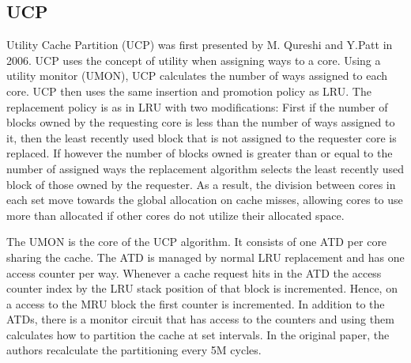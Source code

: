 \subsection{UCP}
\label{sec:background:algorithms:ucp}

Utility Cache Partition (UCP)\cite{Qureshi2006} was first presented by M. Qureshi and Y.Patt in 2006. 
UCP uses the concept of utility when assigning ways to a core.
Using a utility monitor (UMON), UCP calculates the number of ways assigned to each core.
UCP then uses the same insertion and promotion policy as LRU.
The replacement policy is as in LRU with two modifications:
First if the number of blocks owned by the requesting core is less than the number of ways assigned to it, then the least recently used block that is not assigned to the requester core is replaced.
If however the number of blocks owned is greater than or equal to the number of assigned ways the replacement algorithm selects the  least recently used block of those owned by the requester.
As a result, the division between cores in each set move towards the global allocation on cache misses, allowing cores to use more than allocated if other cores do not utilize their allocated space.

The UMON is the core of the UCP algorithm.
It consists of one ATD per core sharing the cache. 
The ATD is managed by normal LRU replacement and has one access counter per way.
Whenever a cache request hits in the ATD the access counter index by the LRU stack position of that block is incremented.
Hence, on a access to the MRU block the first counter is incremented.
In addition to the ATDs, there is a monitor circuit that has access to the counters and using them calculates how to partition the cache at set intervals. 
In the original paper, the authors recalculate the partitioning every 5M cycles.

